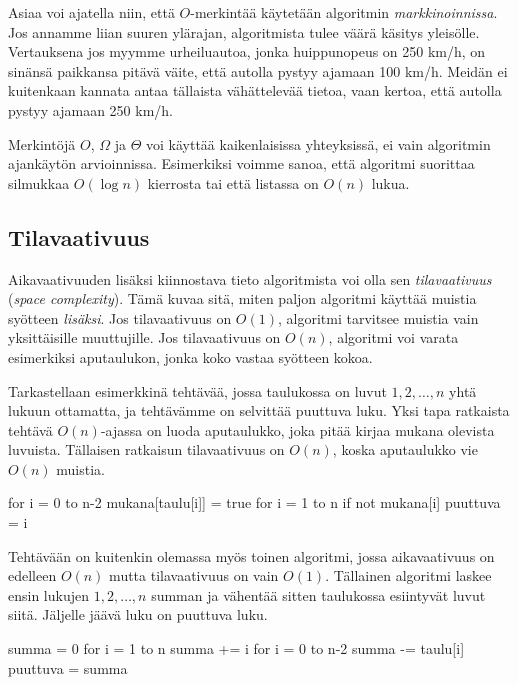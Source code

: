 Asiaa voi ajatella niin, että $O$-merkintää käytetään algoritmin
\emph{markkinoinnissa}. Jos annamme liian suuren ylärajan, algoritmista
tulee väärä käsitys yleisölle.
Vertauksena jos myymme urheiluautoa, jonka huippunopeus on 250 km/h,
on sinänsä paikkansa pitävä väite, että autolla pystyy ajamaan 100 km/h.
Meidän ei kuitenkaan kannata antaa tällaista vähättelevää tietoa,
vaan kertoa, että autolla pystyy ajamaan 250 km/h.

Merkintöjä $O$, $\Omega$ ja $\Theta$ voi käyttää
kaikenlaisissa yhteyksissä, ei vain algoritmin ajankäytön arvioinnissa.
Esimerkiksi voimme sanoa, että algoritmi suorittaa silmukkaa $O(\log n)$ kierrosta
tai että listassa on $O(n)$ lukua.

\subsection{Tilavaativuus}


Aikavaativuuden lisäksi kiinnostava tieto algoritmista voi olla sen
\emph{tilavaativuus} (\emph{space complexity}). Tämä kuvaa sitä, miten paljon algoritmi
käyttää muistia syötteen \emph{lisäksi}.
Jos tilavaativuus on $O(1)$, algoritmi tarvitsee muistia
vain yksittäisille muuttujille.
Jos tilavaativuus on $O(n)$, algoritmi voi varata esimerkiksi aputaulukon,
jonka koko vastaa syötteen kokoa.

Tarkastellaan esimerkkinä tehtävää, jossa taulukossa on
luvut $1,2,\dots,n$ yhtä lukuun ottamatta,
ja tehtävämme on selvittää puuttuva luku.
Yksi tapa ratkaista tehtävä $O(n)$-ajassa on luoda aputaulukko,
joka pitää kirjaa mukana olevista luvuista.
Tällaisen ratkaisun tilavaativuus on $O(n)$,
koska aputaulukko vie $O(n)$ muistia.

\begin{code}
    for i = 0 to n-2
    mukana[taulu[i]] = true
    for i = 1 to n
    if not mukana[i]
    puuttuva = i
\end{code}

Tehtävään on kuitenkin olemassa myös toinen algoritmi,
jossa aikavaativuus on edelleen $O(n)$ mutta tilavaativuus on vain $O(1)$.
Tällainen algoritmi laskee ensin lukujen $1,2,\dots,n$ summan
ja vähentää sitten taulukossa esiintyvät luvut siitä.
Jäljelle jäävä luku on puuttuva luku.

\begin{code}
    summa = 0
    for i = 1 to n
    summa += i
    for i = 0 to n-2
    summa -= taulu[i]
    puuttuva = summa
\end{code}

